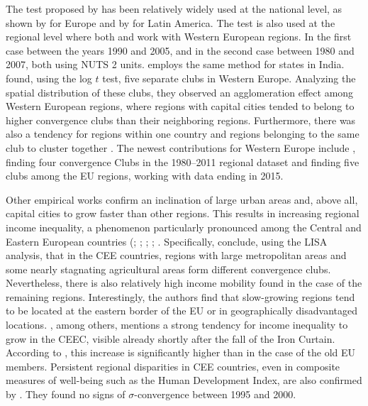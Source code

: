 \documentclass[11pt]{article}
\begin{document}
The test proposed by \citet{phillips2007transition} has been relatively widely used at the national level, as shown by \citet{borsi2015evolution, fritsche2011analysing, monfort2013real,apergis2010old} for Europe and by \citet{rodriguez2014there} for Latin America. The test is also used at the regional level where both \citet{bartkowska2012regional} and \citet{pinho2010regional} work with Western European regions. In the first case between the years 1990 and 2005, and in the second case between 1980 and 2007, both using NUTS 2 units. \citet{ghosh2013regional} employs the same method for states in India. \citet{bartkowska2012regional} found, using the log $t$ test, five separate clubs in Western Europe. Analyzing the spatial distribution of these clubs, they observed an agglomeration effect among Western European regions, where regions with capital cities tended to belong to higher convergence clubs than their neighboring regions. Furthermore, there was also a tendency for regions within one country and regions belonging to the same club to cluster together \citep{bartkowska2012regional}. The newest contributions for Western Europe include \citet{von2017regional}, finding four convergence Clubs in the 1980–2011 regional dataset and \citet{cutrini2019economic} finding five clubs among the EU regions, working with data ending in 2015. 

Other empirical works confirm an inclination of large urban areas and, above all, capital cities to grow faster than other regions. This results in increasing regional income inequality, a phenomenon particularly pronounced among the Central and Eastern European countries (\citet{cuaresma2014determinants}; \citet{sme2012regional}; \citet{szendi2013convergence}; \citet{chapman2012income}; \citet{monastiriotis2011regional}. Specifically, \citet{sme2012regional} conclude, using the LISA analysis, that in the CEE countries, regions with large metropolitan areas and some nearly stagnating agricultural areas form different convergence clubs. Nevertheless, there is also relatively high income mobility found in the case of the remaining regions. Interestingly, the authors find that slow-growing regions tend to be located at the eastern border of the EU or in geographically disadvantaged locations. \citet{monastiriotis2011regional}, among others, mentions a strong tendency for income inequality to grow in the CEEC, visible already shortly after the fall of the Iron Curtain. According to \citeauthor{monastiriotis2011regional}, this increase is significantly higher than in the case of the old EU members. Persistent regional disparities in CEE countries, even in composite measures of well-being such as the Human Development Index, are also confirmed by \citet{benedek2015paths}. They found no signs of $\sigma$-convergence between 1995 and 2000.  
\end{document}
